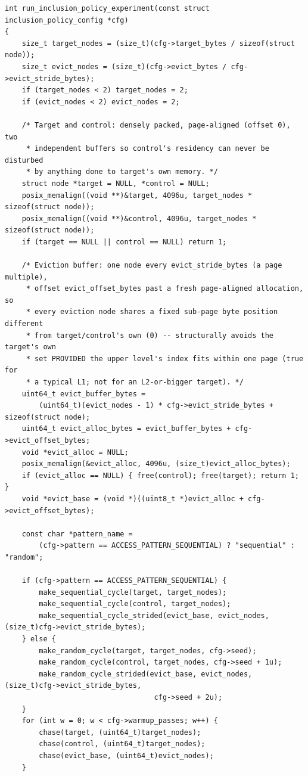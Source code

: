 \documentclass{article}
\begin{document}
\begin{lstlisting}[caption={Inclusion/exclusion behavior. Target property: inclusion policy between an upper (inner) and lower (outer) cache level. Architecture: portable common code. File: \texttt{main\_code/common/inclusion\_policy.c}, commit \texttt{7be6dac}.},label={lst:inclusion}]
int run_inclusion_policy_experiment(const struct inclusion_policy_config *cfg)
{
    size_t target_nodes = (size_t)(cfg->target_bytes / sizeof(struct node));
    size_t evict_nodes = (size_t)(cfg->evict_bytes / cfg->evict_stride_bytes);
    if (target_nodes < 2) target_nodes = 2;
    if (evict_nodes < 2) evict_nodes = 2;

    /* Target and control: densely packed, page-aligned (offset 0), two
     * independent buffers so control's residency can never be disturbed
     * by anything done to target's own memory. */
    struct node *target = NULL, *control = NULL;
    posix_memalign((void **)&target, 4096u, target_nodes * sizeof(struct node));
    posix_memalign((void **)&control, 4096u, target_nodes * sizeof(struct node));
    if (target == NULL || control == NULL) return 1;

    /* Eviction buffer: one node every evict_stride_bytes (a page multiple),
     * offset evict_offset_bytes past a fresh page-aligned allocation, so
     * every eviction node shares a fixed sub-page byte position different
     * from target/control's own (0) -- structurally avoids the target's own
     * set PROVIDED the upper level's index fits within one page (true for
     * a typical L1; not for an L2-or-bigger target). */
    uint64_t evict_buffer_bytes =
        (uint64_t)(evict_nodes - 1) * cfg->evict_stride_bytes + sizeof(struct node);
    uint64_t evict_alloc_bytes = evict_buffer_bytes + cfg->evict_offset_bytes;
    void *evict_alloc = NULL;
    posix_memalign(&evict_alloc, 4096u, (size_t)evict_alloc_bytes);
    if (evict_alloc == NULL) { free(control); free(target); return 1; }
    void *evict_base = (void *)((uint8_t *)evict_alloc + cfg->evict_offset_bytes);

    const char *pattern_name =
        (cfg->pattern == ACCESS_PATTERN_SEQUENTIAL) ? "sequential" : "random";

    if (cfg->pattern == ACCESS_PATTERN_SEQUENTIAL) {
        make_sequential_cycle(target, target_nodes);
        make_sequential_cycle(control, target_nodes);
        make_sequential_cycle_strided(evict_base, evict_nodes, (size_t)cfg->evict_stride_bytes);
    } else {
        make_random_cycle(target, target_nodes, cfg->seed);
        make_random_cycle(control, target_nodes, cfg->seed + 1u);
        make_random_cycle_strided(evict_base, evict_nodes, (size_t)cfg->evict_stride_bytes,
                                   cfg->seed + 2u);
    }
    for (int w = 0; w < cfg->warmup_passes; w++) {
        chase(target, (uint64_t)target_nodes);
        chase(control, (uint64_t)target_nodes);
        chase(evict_base, (uint64_t)evict_nodes);
    }


\end{lstlisting}
\end{document}
